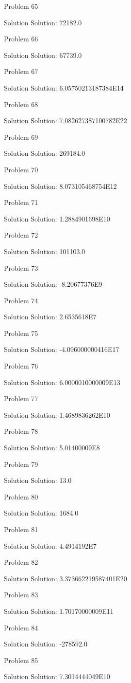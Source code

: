\documentclass{article}
\begin{document}
Problem 65

Solution Solution: 72182.0

Problem 66

Solution Solution: 67739.0

Problem 67

Solution Solution: 6.05750213187384E14

Problem 68

Solution Solution: 7.082627387100782E22

Problem 69

Solution Solution: 269184.0

Problem 70

Solution Solution: 8.073105468754E12

Problem 71

Solution Solution: 1.2884901698E10

Problem 72

Solution Solution: 101103.0

Problem 73

Solution Solution: -8.20677376E9

Problem 74

Solution Solution: 2.6535618E7

Problem 75

Solution Solution: -4.096000000416E17

Problem 76

Solution Solution: 6.0000010000009E13

Problem 77

Solution Solution: 1.4689836262E10

Problem 78

Solution Solution: 5.01400009E8

Problem 79

Solution Solution: 13.0

Problem 80

Solution Solution: 1684.0

Problem 81

Solution Solution: 4.4914192E7

Problem 82

Solution Solution: 3.373662219587401E20

Problem 83

Solution Solution: 1.70170000009E11

Problem 84

Solution Solution: -278592.0

Problem 85

Solution Solution: 7.3014444049E10
\end{document}
